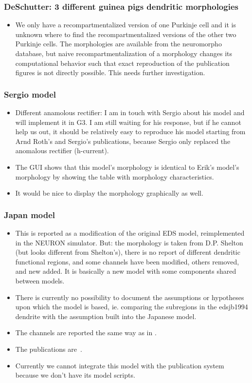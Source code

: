 \documentclass[12pt]{article}
\begin{document}
\subsubsection{DeSchutter: 3 different guinea pigs dendritic
  morphologies}
\begin{itemize}
\item We only have a recompartmentalized version of one Purkinje cell
  and it is unknown where to find the recompartmentalized versions of
  the other two Purkinje cells.  The morphologies are available from
  the neuromorpho database, but naive recompartmentalization of a
  morphology changes its computational behavior such that exact
  reproduction of the publication figures is not directly possible.
  This needs further investigation.
\end{itemize}


\subsubsection{Sergio model}
\begin{itemize}
\item Different anamolous rectifier: I am in touch with Sergio about
  his model and will implement it in G3.  I am still waiting for his
  response, but if he cannot help us out, it should be relatively easy
  to reproduce his model starting from Arnd Roth's and Sergio's
  publications, because Sergio only replaced the anomalous rectifier
  (h-current).
\item The GUI shows that this model's morphology is identical to
  Erik's model's morphology by showing the table with morphology
  characteristics.
\item It would be nice to display the morphology graphically as well.
\end{itemize}

\subsubsection{Japan model}
\begin{itemize}
\item This is reported as a modification of the original EDS model,
  reimplemented in the NEURON simulator.  But: the morphology is taken
  from D.P. Shelton (but looks different from Shelton's), there is no
  report of different dendritic functional regions, and some channels
  have been modified, others removed, and new added.  It is basically
  a new model with some components shared between models.
\item There is currently no possibility to document the assumptions or
  hypotheses upon which the model is based, ie. comparing the
  subregions in the edsjb1994 dendrite with the assumption built into
  the Japanese model.
\item The channels are reported the same way as in
  \cite{deschutter94:_purkin_i}.
\item The publications are~\cite{miyasho01:_low_ca2_purkin,
    chono03:_purkin}.
\item Currently we cannot integrate this model with the publication
  system because we don't have its model scripts.
\end{itemize}
\end{document}

